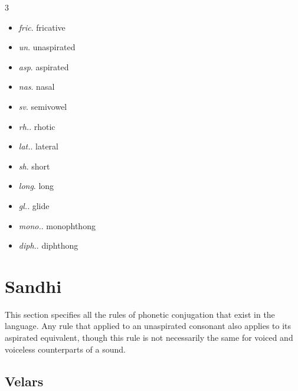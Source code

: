 \documentclass[14pt,oneside]{book}
\begin{document}
\begin{multicols}{3}

\begin{itemize}
    
    \item \textit{fric}.  {\textemdash} fricative
    \item \textit{un}.  {\textemdash} unaspirated
    \item \textit{asp}.  {\textemdash} aspirated
    \item \textit{nas}.  {\textemdash} nasal
    \item \textit{sv}. {\textemdash} semivowel
    \item \textit{rh.}. {\textemdash} rhotic
    \item \textit{lat.}. {\textemdash} lateral
    \item \textit{sh}.  {\textemdash} short
    \item \textit{long}.  {\textemdash} long
    \item \textit{gl.}.  {\textemdash} glide
    \item \textit{mono.}.  {\textemdash} monophthong
    \item \textit{diph.}.  {\textemdash} diphthong

\end{itemize}

\end{multicols}




\pagebreak

\section{Sandhi}

This section specifies all the rules of phonetic conjugation that exist in the language. Any rule that applied to an unaspirated consonant also applies to its aspirated equivalent, though this rule is not necessarily the same for voiced and voiceless counterparts of a sound.


\subsection{Velars}
\end{document}
